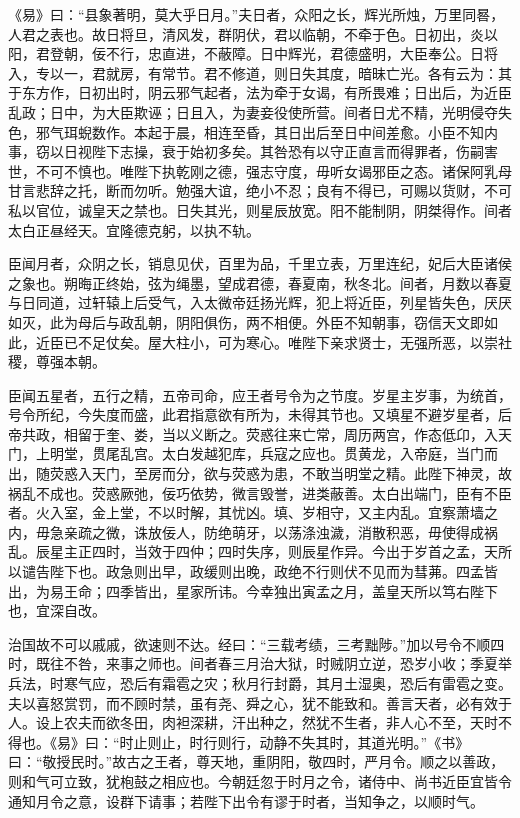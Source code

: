 \documentclass[]{article}
\begin{document}
《易》曰：``县象著明，莫大乎日月。''夫日者，众阳之长，辉光所烛，万里同晷，人君之表也。故日将旦，清风发，群阴伏，君以临朝，不牵于色。日初出，炎以阳，君登朝，佞不行，忠直进，不蔽障。日中辉光，君德盛明，大臣奉公。日将入，专以一，君就房，有常节。君不修道，则日失其度，暗昧亡光。各有云为：其于东方作，日初出时，阴云邪气起者，法为牵于女谒，有所畏难；日出后，为近臣乱政；日中，为大臣欺诬；日且入，为妻妾役使所营。间者日尤不精，光明侵夺失色，邪气珥蜺数作。本起于晨，相连至昏，其日出后至日中间差愈。小臣不知内事，窃以日视陛下志操，衰于始初多矣。其咎恐有以守正直言而得罪者，伤嗣害世，不可不慎也。唯陛下执乾刚之德，强志守度，毋听女谒邪臣之态。诸保阿乳母甘言悲辞之托，断而勿听。勉强大谊，绝小不忍；良有不得已，可赐以货财，不可私以官位，诚皇天之禁也。日失其光，则星辰放宽。阳不能制阴，阴桀得作。间者太白正昼经天。宜隆德克躬，以执不轨。

臣闻月者，众阴之长，销息见伏，百里为品，千里立表，万里连纪，妃后大臣诸侯之象也。朔晦正终始，弦为绳墨，望成君德，春夏南，秋冬北。间者，月数以春夏与日同道，过轩辕上后受气，入太微帝廷扬光辉，犯上将近臣，列星皆失色，厌厌如灭，此为母后与政乱朝，阴阳俱伤，两不相便。外臣不知朝事，窃信天文即如此，近臣已不足仗矣。屋大柱小，可为寒心。唯陛下亲求贤士，无强所恶，以崇社稷，尊强本朝。

臣闻五星者，五行之精，五帝司命，应王者号令为之节度。岁星主岁事，为统首，号令所纪，今失度而盛，此君指意欲有所为，未得其节也。又填星不避岁星者，后帝共政，相留于奎、娄，当以义断之。荧惑往来亡常，周历两宫，作态低卬，入天门，上明堂，贯尾乱宫。太白发越犯库，兵寇之应也。贯黄龙，入帝庭，当门而出，随荧惑入天门，至房而分，欲与荧惑为患，不敢当明堂之精。此陛下神灵，故祸乱不成也。荧惑厥弛，佞巧依势，微言毁誉，进类蔽善。太白出端门，臣有不臣者。火入室，金上堂，不以时解，其忧凶。填、岁相守，又主内乱。宜察萧墙之内，毋急亲疏之微，诛放佞人，防绝萌牙，以荡涤浊濊，消散积恶，毋使得成祸乱。辰星主正四时，当效于四仲；四时失序，则辰星作异。今出于岁首之孟，天所以谴告陛下也。政急则出早，政缓则出晚，政绝不行则伏不见而为彗茀。四孟皆出，为易王命；四季皆出，星家所讳。今幸独出寅孟之月，盖皇天所以笃右陛下也，宜深自改。

治国故不可以戚戚，欲速则不达。经曰：``三载考绩，三考黜陟。''加以号令不顺四时，既往不咎，来事之师也。间者春三月治大狱，时贼阴立逆，恐岁小收；季夏举兵法，时寒气应，恐后有霜雹之灾；秋月行封爵，其月土湿奥，恐后有雷雹之变。夫以喜怒赏罚，而不顾时禁，虽有尧、舜之心，犹不能致和。善言天者，必有效于人。设上农夫而欲冬田，肉袒深耕，汗出种之，然犹不生者，非人心不至，天时不得也。《易》曰：``时止则止，时行则行，动静不失其时，其道光明。''《书》曰：``敬授民时。''故古之王者，尊天地，重阴阳，敬四时，严月令。顺之以善政，则和气可立致，犹枹鼓之相应也。今朝廷忽于时月之令，诸侍中、尚书近臣宜皆令通知月令之意，设群下请事；若陛下出令有谬于时者，当知争之，以顺时气。
\end{document}
